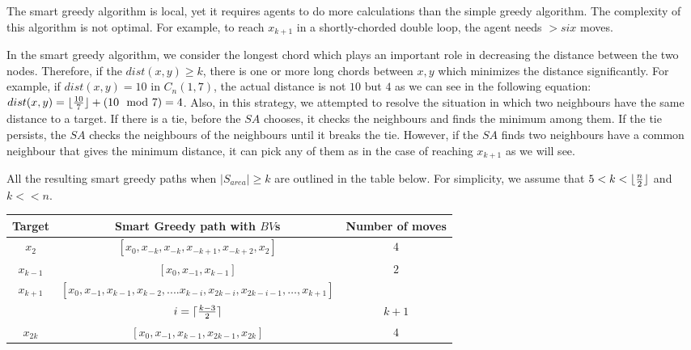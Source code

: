 The smart greedy algorithm is local, yet it requires agents to do more calculations than the simple greedy algorithm. The complexity of this algorithm is not optimal. For example, to reach $x_{k+1}$ in a shortly-chorded double loop, the agent needs $>six$ moves.

In the smart greedy algorithm, we consider the longest chord which plays an important role in decreasing the distance between the two nodes. Therefore, if the $dist(x,y)\ge k$, there is one or more long chords between $x,y$ which minimizes the distance significantly. For example, if $dist(x,y)=10$ in $C_n(1,7)$, the actual distance is not $10$ but $4$ as we can see in the following equation:
$dist(x,y)= \lfloor{10 \over 7}\rfloor + (10 \mod 7) =4$.
Also, in this strategy, we attempted to resolve the situation in which two neighbours have the same distance to a target. If there is a tie, before the $SA$ chooses, it checks the neighbours and finds the minimum among them. If the tie persists, the $SA$ checks the neighbours of the neighbours until it breaks the tie. However, if the $SA$ finds two neighbours have a common neighbour that gives the minimum distance, it can pick any of them as in the case of reaching $x_{k+1}$ as we will see.


\noindent All the resulting smart greedy paths when  $\left\vert{S_{area}}\right\vert \ge k$ are outlined in the table below. For simplicity, we assume that $5<k<\lfloor {n \over 2} \rfloor$  and $k<<n$. 
\begin{center}
  \begin{tabular}{|c|c|c|}
 \hline
 Target & Smart Greedy path with $BV$s & Number of moves 
\\
 \hline
$x_2$ &$[x_0, x_{-k}, x_{-k}, x_{-k+1},x_{-k+2}, x_2]$ & $4$ \\

\hline
 $x_{k-1}$ & $[x_0, x_{-1}, x_{k-1}]$ & $2$\\

 \hline
 $x_{k+1}$ &  $[x_0, x_{-1}, x_{k-1}, x_{k-2}, .... x_{k-i}, x_{2k-i}, x_{2k-i-1}, \ldots, x_{k+1}]$ &\\
    &  $i = \lceil{{ k-3} \over 2}\rceil$  & $k+1$ \\  

 
 \hline
 $x_{2k}$ & $[x_0, x_{-1}, x_{k-1}, x_{2k-1},x_{2k}]$ & $4$ \\

\hline
\end{tabular} 
\label{smart-path}

 \end{center}

